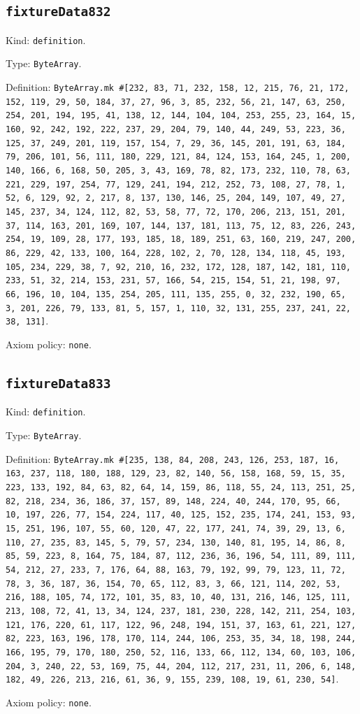 \documentclass[11pt]{article}
\begin{document}
\subsection*{\texttt{fixtureData832}}
\noindent Kind: \texttt{definition}.\par
\noindent Type: \texttt{ByteArray}.\par
\noindent Definition: \texttt{ByteArray.mk \#[232, 83, 71, 232, 158, 12, 215, 76, 21, 172, 152, 119, 29, 50, 184, 37, 27, 96, 3, 85, 232, 56, 21, 147, 63, 250, 254, 201, 194, 195, 41, 138, 12, 144, 104, 104, 253, 255, 23, 164, 15, 160, 92, 242, 192, 222, 237, 29, 204, 79, 140, 44, 249, 53, 223, 36, 125, 37, 249, 201, 119, 157, 154, 7, 29, 36, 145, 201, 191, 63, 184, 79, 206, 101, 56, 111, 180, 229, 121, 84, 124, 153, 164, 245, 1, 200, 140, 166, 6, 168, 50, 205, 3, 43, 169, 78, 82, 173, 232, 110, 78, 63, 221, 229, 197, 254, 77, 129, 241, 194, 212, 252, 73, 108, 27, 78, 1, 52, 6, 129, 92, 2, 217, 8, 137, 130, 146, 25, 204, 149, 107, 49, 27, 145, 237, 34, 124, 112, 82, 53, 58, 77, 72, 170, 206, 213, 151, 201, 37, 114, 163, 201, 169, 107, 144, 137, 181, 113, 75, 12, 83, 226, 243, 254, 19, 109, 28, 177, 193, 185, 18, 189, 251, 63, 160, 219, 247, 200, 86, 229, 42, 133, 100, 164, 228, 102, 2, 70, 128, 134, 118, 45, 193, 105, 234, 229, 38, 7, 92, 210, 16, 232, 172, 128, 187, 142, 181, 110, 233, 51, 32, 214, 153, 231, 57, 166, 54, 215, 154, 51, 21, 198, 97, 66, 196, 10, 104, 135, 254, 205, 111, 135, 255, 0, 32, 232, 190, 65, 3, 201, 226, 79, 133, 81, 5, 157, 1, 110, 32, 131, 255, 237, 241, 22, 38, 131]}.\par
\noindent Axiom policy: \texttt{none}.\par
\subsection*{\texttt{fixtureData833}}
\noindent Kind: \texttt{definition}.\par
\noindent Type: \texttt{ByteArray}.\par
\noindent Definition: \texttt{ByteArray.mk \#[235, 138, 84, 208, 243, 126, 253, 187, 16, 163, 237, 118, 180, 188, 129, 23, 82, 140, 56, 158, 168, 59, 15, 35, 223, 133, 192, 84, 63, 82, 64, 14, 159, 86, 118, 55, 24, 113, 251, 25, 82, 218, 234, 36, 186, 37, 157, 89, 148, 224, 40, 244, 170, 95, 66, 10, 197, 226, 77, 154, 224, 117, 40, 125, 152, 235, 174, 241, 153, 93, 15, 251, 196, 107, 55, 60, 120, 47, 22, 177, 241, 74, 39, 29, 13, 6, 110, 27, 235, 83, 145, 5, 79, 57, 234, 130, 140, 81, 195, 14, 86, 8, 85, 59, 223, 8, 164, 75, 184, 87, 112, 236, 36, 196, 54, 111, 89, 111, 54, 212, 27, 233, 7, 176, 64, 88, 163, 79, 192, 99, 79, 123, 11, 72, 78, 3, 36, 187, 36, 154, 70, 65, 112, 83, 3, 66, 121, 114, 202, 53, 216, 188, 105, 74, 172, 101, 35, 83, 10, 40, 131, 216, 146, 125, 111, 213, 108, 72, 41, 13, 34, 124, 237, 181, 230, 228, 142, 211, 254, 103, 121, 176, 220, 61, 117, 122, 96, 248, 194, 151, 37, 163, 61, 221, 127, 82, 223, 163, 196, 178, 170, 114, 244, 106, 253, 35, 34, 18, 198, 244, 166, 195, 79, 170, 180, 250, 52, 116, 133, 66, 112, 134, 60, 103, 106, 204, 3, 240, 22, 53, 169, 75, 44, 204, 112, 217, 231, 11, 206, 6, 148, 182, 49, 226, 213, 216, 61, 36, 9, 155, 239, 108, 19, 61, 230, 54]}.\par
\noindent Axiom policy: \texttt{none}.\par
\end{document}
